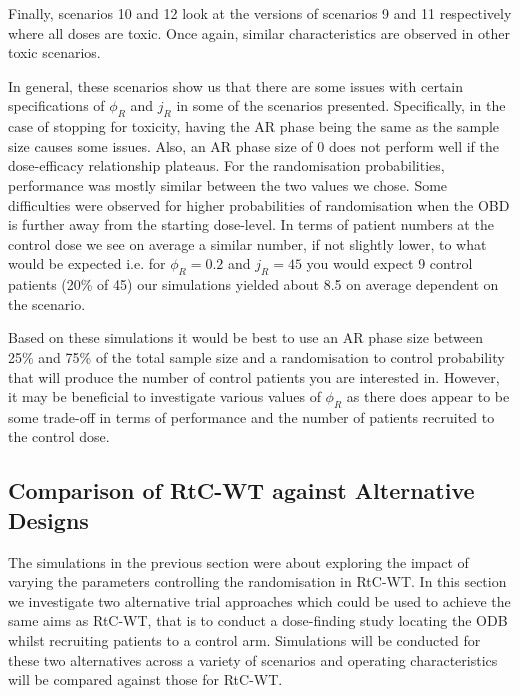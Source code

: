 Finally, scenarios 10 and 12 look at the versions of scenarios 9 and 11 respectively where all doses are toxic. Once again, similar characteristics are observed in other toxic scenarios. 

In general, these scenarios show us that there are some issues with certain specifications of $\phi_R$ and $j_R$ in some of the scenarios presented. Specifically, in the case of stopping for toxicity, having the AR phase being the same as the sample size causes some issues. Also, an AR phase size of 0 does not perform well if the dose-efficacy relationship plateaus. For the randomisation probabilities, performance was mostly similar between the two values we chose. Some difficulties were observed for higher probabilities of randomisation when the OBD is further away from the starting dose-level. In terms of patient numbers at the control dose we see on average a similar number, if not slightly lower, to what would be expected i.e. for $\phi_R = 0.2$ and  $j_R = 45$ you would expect 9 control patients (20\% of 45) our simulations yielded about 8.5 on average dependent on the scenario. 

Based on these simulations it would be best to use an AR phase size between 25\% and 75\% of the total sample size and a randomisation to control probability that will produce the number of control patients you are interested in. However, it may be beneficial to investigate various values of $\phi_R$ as there does appear to be some trade-off in terms of performance and the number of patients recruited to the control dose.




 \subsection{Comparison of RtC-WT against Alternative Designs }
 \label{WT:CompAltDesigns}
 
 The simulations in the previous section were about exploring the impact of varying the parameters controlling the randomisation in RtC-WT. In this section we investigate two alternative trial approaches which could be used to achieve the same aims as RtC-WT, that is to conduct a dose-finding study locating the ODB whilst recruiting patients to a control arm. Simulations will be conducted for these two alternatives across a variety of scenarios and operating characteristics will be compared against those for RtC-WT.       
 
